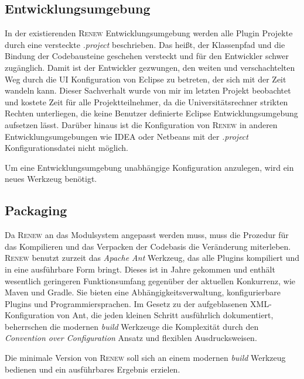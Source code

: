 \subsection{Entwicklungsumgebung} 
	In der existierenden \textsc{Renew} Entwicklungsumgebung werden alle Plugin Projekte durch eine versteckte \textit{.project} beschrieben. Das heißt, der Klassenpfad und die Bindung der Codebausteine geschehen versteckt und für den Entwickler schwer zugänglich. Damit ist der Entwickler gezwungen, den weiten und verschachtelten Weg durch die UI Konfiguration von Eclipse zu betreten, der sich mit der Zeit wandeln kann. Dieser Sachverhalt wurde von mir im letzten Projekt beobachtet und kostete Zeit für alle Projektteilnehmer, da die Universitätsrechner strikten Rechten unterliegen, die keine Benutzer definierte Eclipse Entwicklungsumgebung aufsetzen lässt. Darüber hinaus ist die Konfiguration von \textsc{Renew} in anderen Entwicklungsumgebungen wie IDEA oder Netbeans mit der \textit{.project} Konfigurationsdatei nicht möglich. \bigbreak

	Um eine Entwicklungsumgebung unabhängige Konfiguration anzulegen, wird ein neues Werkzeug benötigt. 

\subsection{Packaging}
	Da \textsc{Renew} an das Modulsystem angepasst werden muss, muss die Prozedur für das Kompilieren und das Verpacken der Codebasis die Veränderung miterleben.\newline
	\textsc{Renew} benutzt zurzeit das \textit{Apache Ant} Werkzeug, das alle Plugins kompiliert und in eine ausführbare Form bringt. Dieses ist in Jahre gekommen und enthält wesentlich geringeren Funktionsumfang gegenüber der aktuellen Konkurrenz, wie Maven und Gradle. Sie bieten eine Abhängigkeitsverwaltung, konfigurierbare Plugins und Programmiersprachen. Im Gesetz zu der aufgeblasenen XML-Konfiguration von Ant, die jeden kleinen Schritt ausführlich dokumentiert, beherrschen die modernen \textit{build} Werkzeuge die Komplexität durch den \textit{Convention over Configuration} Ansatz und flexiblen Ausdrucksweisen. \bigbreak

	Die minimale Version von \textsc{Renew} soll sich an einem modernen \textit{build} Werkzeug bedienen und ein ausführbares Ergebnis erzielen.

